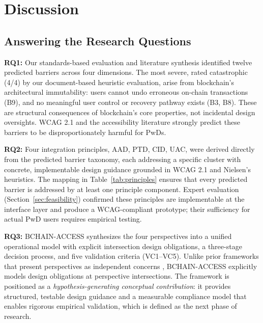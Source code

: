 \documentclass[journal,onecolumn]{IEEEtran}
\begin{document}
\section{Discussion}
\label{sec:discussion}

\subsection{Answering the Research Questions}

\textbf{RQ1:} Our standards-based evaluation and literature synthesis identified twelve predicted barriers across four dimensions. The most severe, rated catastrophic (4/4) by our document-based heuristic evaluation, arise from blockchain's architectural immutability: users cannot undo erroneous on-chain transactions (B9), and no meaningful user control or recovery pathway exists (B3, B8). These are structural consequences of blockchain's core properties, not incidental design oversights. WCAG 2.1 and the accessibility literature strongly predict these barriers to be disproportionately harmful for PwDs.

\textbf{RQ2:} Four integration principles, AAD, PTD, CID, UAC, were derived directly from the predicted barrier taxonomy, each addressing a specific cluster with concrete, implementable design guidance grounded in WCAG 2.1 and Nielsen's heuristics. The mapping in Table~\ref{tab:principles} ensures that every predicted barrier is addressed by at least one principle component. Expert evaluation (Section~\ref{sec:feasibility}) confirmed these principles are implementable at the interface layer and produce a WCAG-compliant prototype; their sufficiency for actual PwD users requires empirical testing.

\textbf{RQ3:} BCHAIN-ACCESS synthesizes the four perspectives into a unified operational model with explicit intersection design obligations, a three-stage decision process, and five validation criteria (VC1--VC5). Unlike prior frameworks that present perspectives as independent concerns \cite{khalid2023blockchain,tharani2022ui}, BCHAIN-ACCESS explicitly models design obligations at perspective intersections. The framework is positioned as a \textit{hypothesis-generating conceptual contribution}: it provides structured, testable design guidance and a measurable compliance model that enables rigorous empirical validation, which is defined as the next phase of research.
\end{document}
